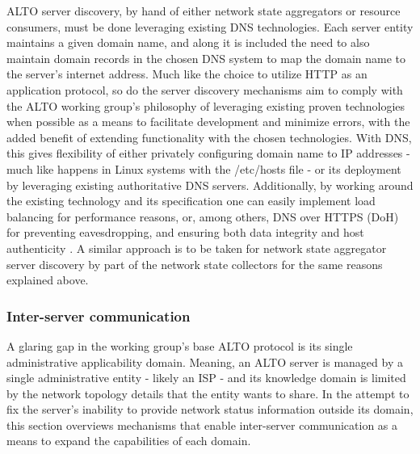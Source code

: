     ALTO server discovery, by hand of either network state aggregators or resource consumers, must be done leveraging existing DNS technologies.
    Each server entity maintains a given domain name, and along it is included the need to also maintain domain records in the chosen DNS system to map the domain name to the server's internet address.
    Much like the choice to utilize HTTP as an application protocol, so do the server discovery mechanisms aim to comply with the ALTO working group's philosophy of leveraging existing proven technologies when possible as a means to facilitate development and minimize errors, with the added benefit of extending functionality with the chosen technologies.
    With DNS, this gives flexibility of either privately configuring domain name to IP addresses - much like happens in Linux systems with the /etc/hosts file - or its deployment by leveraging existing authoritative DNS servers.
    Additionally, by working around the existing technology and its specification one can easily implement load balancing for performance reasons, or, among others, DNS over HTTPS (DoH) for preventing eavesdropping, and ensuring both data integrity and host authenticity \cite{dns-https}.
    A similar approach is to be taken for network state aggregator server discovery by part of the network state collectors for the same reasons explained above.

\subsubsection{Inter-server communication}
\label{ssec:multi-alto}

    A glaring gap in the working group's base ALTO protocol is its single administrative applicability domain.
    Meaning, an ALTO server is managed by a single administrative entity - likely an ISP - and its knowledge domain is limited by the network topology details that the entity wants to share.
    In the attempt to fix the server's inability to provide network status information outside its domain, this section overviews mechanisms that enable inter-server communication as a means to expand the capabilities of each domain.

